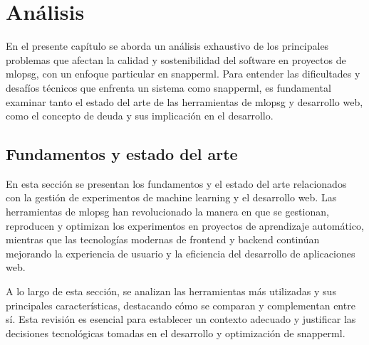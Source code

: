 \chapter{Análisis}
En el presente capítulo se aborda un análisis exhaustivo de los principales problemas que afectan la calidad y sostenibilidad del software en proyectos de \Gls{mlopsg}, con un enfoque particular en \Gls{snapperml}. Para entender las dificultades y desafíos técnicos que enfrenta un sistema como \Gls{snapperml}, es fundamental examinar tanto el estado del arte de las herramientas de \Gls{mlopsg} y desarrollo web, como el concepto de \gls{deuda} y sus implicación en el desarrollo.

\section{Fundamentos y estado del arte}
En esta sección se presentan los fundamentos y el estado del arte relacionados con la gestión de experimentos de machine learning y el desarrollo web. Las herramientas de \Gls{mlopsg} han revolucionado la manera en que se gestionan, reproducen y optimizan los experimentos en proyectos de aprendizaje automático, mientras que las tecnologías modernas de frontend y backend continúan mejorando la experiencia de usuario y la eficiencia del desarrollo de aplicaciones web.

A lo largo de esta sección, se analizan las herramientas más utilizadas y sus principales características, destacando cómo se comparan y complementan entre sí. Esta revisión es esencial para establecer un contexto adecuado y justificar las decisiones tecnológicas tomadas en el desarrollo y optimización de \Gls{snapperml}.


